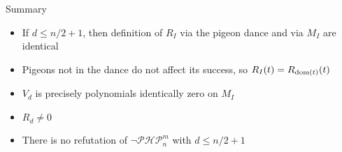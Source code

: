 \documentclass[xcolor={dvipsnames}]{beamer}
\newcommand{\PHP}{\ensuremath{\neg \mathcal{PHP}^m_n}\xspace}
\begin{document}
\begin{frame}{Summary}
    \begin{itemize}[<+->]
        \item If $d \leq n/2 + 1$, then definition of $R_I$ via the pigeon dance and via $M_I$ are identical
        \item Pigeons not in the dance do not affect its success, so $R_I(t) = R_{\operatorname{dom}(t)}(t)$
        \item $V_d$ is precisely polynomials identically zero on $M_I$
        \item $R_d \neq 0$
        \item There is no refutation of \PHP with $d \leq n/2 +1$
    \end{itemize}
\end{frame}
\end{document}
